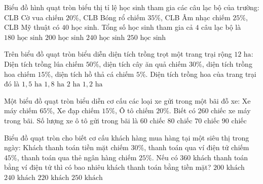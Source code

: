 \begin{ex} %
Biểu đồ hình quạt tròn biểu thị tỉ lệ học sinh tham gia các câu lạc bộ của trường: CLB Cờ vua chiếm $20\%$, CLB Bóng rổ chiếm $35\%$, CLB Âm nhạc chiếm $25\%$, CLB Mỹ thuật có $40$ học sinh. Tổng số học sinh tham gia cả $4$ câu lạc bộ là
\choice
{$180\text{ học sinh}$}
{\True $200\text{ học sinh}$}
{$240\text{ học sinh}$}
{$250\text{ học sinh}$}
\end{ex}

\begin{ex} %
Trên biểu đồ quạt tròn biểu diễn diện tích trồng trọt một trang trại rộng $12\text{ ha}$: Diện tích trồng lúa chiếm $50\%$, diện tích cây ăn quả chiếm $30\%$, diện tích trồng hoa chiếm $15\%$, diện tích hồ thả cá chiếm $5\%$. Diện tích trồng hoa của trang trại đó là
\choice
{$1{,}5\text{ ha}$}
{\True $1{,}8\text{ ha}$}
{$2\text{ ha}$}
{$1{,}2\text{ ha}$}
\end{ex}

\begin{ex} %
Một biểu đồ quạt tròn biểu diễn cơ cấu các loại xe gửi trong một bãi đỗ xe: Xe máy chiếm $65\%$, Xe đạp chiếm $15\%$, Ô tô chiếm $20\%$. Biết có $260$ chiếc xe máy trong bãi. Số lượng xe ô tô gửi trong bãi là
\choice
{$60\text{ chiếc}$}
{\True $80\text{ chiếc}$}
{$70\text{ chiếc}$}
{$90\text{ chiếc}$}
\end{ex}

\begin{ex} %
Biểu đồ quạt tròn cho biết cơ cấu khách hàng mua hàng tại một siêu thị trong ngày: Khách thanh toán tiền mặt chiếm $30\%$, thanh toán qua ví điện tử chiếm $45\%$, thanh toán qua thẻ ngân hàng chiếm $25\%$. Nếu có $360$ khách thanh toán bằng ví điện tử thì có bao nhiêu khách thanh toán bằng tiền mặt?
\choice
{$200\text{ khách}$}
{\True $240\text{ khách}$}
{$220\text{ khách}$}
{$250\text{ khách}$}
\end{ex}

